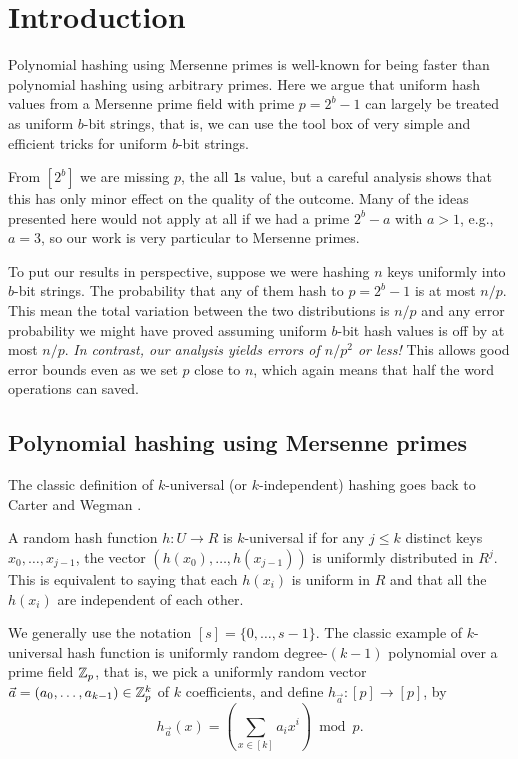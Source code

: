 \section{Introduction}
Polynomial hashing using Mersenne primes is well-known for being faster
than polynomial hashing using arbitrary primes. Here we argue that
uniform hash values from a Mersenne prime field with prime $p=2^b-1$
can largely be treated as uniform $b$-bit strings, that is, we can use
the tool box of very simple and efficient tricks for uniform
$b$-bit strings.

From $[2^b]$ we are missing $p$, the all \texttt1s value, but
a careful analysis shows that this has only minor effect
on the quality of the outcome. Many of the ideas presented
here would not apply at all if we had a prime $2^b-a$ with $a>1$, e.g.,
$a=3$, so our work is very particular to Mersenne primes.

To put our results in perspective, suppose we were hashing $n$ keys uniformly into $b$-bit strings.
The probability that any of them hash to $p=2^b-1$ is at most $n/p$.
This mean the total variation between the two distributions is $n/p$ and any error probability we might have proved assuming uniform $b$-bit hash values is off by at most $n/p$.
\emph{In contrast, our analysis yields errors of $n/p^2$ or less!}
This allows good error bounds even as we set $p$ close to $n$, which again means that half the word operations can saved.




\subsection{Polynomial hashing using Mersenne primes}
The classic definition of $k$-universal (or $k$-independent) hashing
goes back to Carter and Wegman \cite{wegman81kwise}.
\begin{definition}
   A random hash function $h:U\to R$ is $k$-universal if for any $j\leq k$
   distinct keys $x_0,\ldots,x_{j-1}$, the vector
   $(h(x_0),\ldots,h(x_{j-1}))$ is uniformly distributed in $R^j$. This
   is equivalent to saying that each $h(x_i)$ is uniform in $R$ and that
   all the $h(x_i)$ are independent of each other.
\end{definition}
We generally use the notation $[s]=\{0,\ldots,s-1\}$.
The classic example of $k$-universal
hash function is uniformly random degree-$(k-1)$ polynomial over a prime field
$\mathbb Z_p$, that is, we pick a uniformly random vector
$\vec a=(a_0,\ldots,a_{k-1})\in \mathbb Z_p^k$ of $k$ coefficients, and define
$h_{\vec a}:[p]\to[p]$, by 
\[h_{\vec a}(x)=\left(\sum_{x\in[k]}a_i x^i\right)\bmod p.\]

